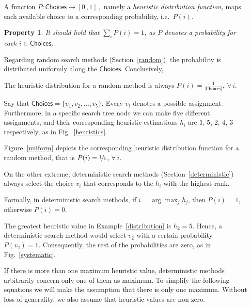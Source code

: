 \documentclass{ws-ijait}
\newtheorem{property}{Property}
\begin{document}
\begin{definition}
  \label{hdf}
  A function $P: \mathsf{Choices} \to [0 \, , 1]\,,$ namely
  a \emph{heuristic distribution function,} maps each
  available choice to a corresponding probability, i.e.\ 
  $P(i)$.
\end{definition}
\begin{property}
  It should hold that $\sum_i P(i) = 1$, as $P$ denotes a
  probability for each $i \in \mathsf{Choices}$.
\end{property}
Regarding random search methods (Section~\ref{random}), the
probability is distributed uniformly along the
$\mathsf{Choices}$. Conclusively,
\begin{proposition}
  \label{probability-random}
  The heuristic distribution for a random method is always
  $P(i) = \frac{1}{|\mathsf{Choices}|}$, $\forall \, i$.
\end{proposition}
\begin{example}
  \label{distribution}
  Say that $\mathsf{Choices} = \{ v_1, v_2, \ldots, v_5 \}$.
  Every $v_i$ denotes a possible assignment. Furthermore, in
  a specific search tree node we can make five different
  assignments, and their corresponding heuristic estimations
  $h_i$ are $1$, $5$, $2$, $4$, $3$ respectively, as in
  Fig.~\ref{heuristics}.

  Figure~\ref{uniform} depicts the corresponding heuristic
  distribution function for a random method, that is $P(i) =
  \nicefrac{1}{5}$, $\forall \, i$.
\end{example}
On the other extreme, deterministic search methods
(Section~\ref{deterministic}) always select the choice $v_i$
that corresponds to the $h_i$ with the highest rank.
\begin{proposition}
  \label{probability-deterministic}
  Formally, in deterministic search methods, if $i =
  \arg\max_j h_j$, then $P(i) = 1$, otherwise $P(i) = 0$.
\end{proposition}
\begin{example}
  The greatest heuristic value in Example~\ref{distribution}
  is $h_2 = 5$. Hence, a deterministic search method would
  select $v_2$ with a certain probability $P(v_2) = 1$.
  Consequently, the rest of the probabilities are zero, as
  in Fig.~\ref{systematic}.
\end{example}
If there is more than one maximum heuristic value,
deterministic methods arbitrarily concern only one of them
as maximum. To simplify the following equations we will make
the assumption that there is only one maximum. Without loss
of generality, we also assume that heuristic values are
non-zero.
\end{document}

